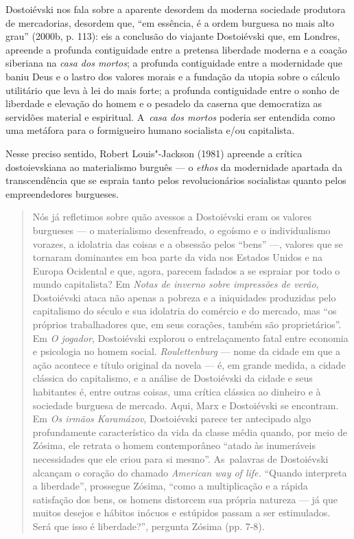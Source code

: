 Dostoiévski nos fala sobre a aparente desordem da moderna sociedade
produtora de mercadorias, desordem que, ``em essência, é a ordem
burguesa no mais alto grau'' (2000b, p. 113): eis a conclusão do
viajante Dostoiévski que, em Londres, apreende a profunda contiguidade
entre a pretensa liberdade moderna e a coação siberiana na \emph{casa
dos mortos}; a profunda contiguidade entre a modernidade que baniu Deus
e o lastro dos valores morais e a fundação da utopia sobre o cálculo
utilitário que leva à lei do mais forte; a profunda contiguidade entre o
sonho de liberdade e elevação do homem e o pesadelo da caserna que
democratiza as servidões material e espiritual. A~\emph{casa dos mortos}
poderia ser entendida como uma metáfora para o formigueiro humano
socialista e/ou capitalista.

Nesse preciso sentido, Robert Louis"-Jackson (1981) apreende a crítica
dostoievskiana ao materialismo burguês --- o \emph{ethos} da modernidade
apartada da transcendência que se espraia tanto pelos revolucionários
socialistas quanto pelos empreendedores burgueses.

\begin{quote}
Nós já refletimos sobre quão avessos a Dostoiévski eram os valores
burgueses --- o materialismo desenfreado, o egoísmo e o individualismo
vorazes, a idolatria das coisas e a obsessão pelos ``bens'' ---, valores
que se tornaram dominantes em boa parte da vida nos Estados Unidos e na
Europa Ocidental e que, agora, parecem fadados a se espraiar por todo o
mundo capitalista? Em \emph{Notas de inverno sobre impressões de verão},
Dostoiévski ataca não apenas a pobreza e a iniquidades produzidas pelo
capitalismo do século  e sua idolatria do comércio e do mercado, mas
``os próprios trabalhadores que, em seus corações, também são
proprietários''. Em \emph{O jogador}, Dostoiévski explorou o
entrelaçamento fatal entre economia e psicologia no homem social.
\emph{Roulettenburg} --- nome da cidade em que a ação acontece e título
original da novela --- é, em grande medida, a cidade clássica do
capitalismo, e a análise de Dostoiévski da cidade e seus habitantes é,
entre outras coisas, uma crítica clássica ao dinheiro e à sociedade
burguesa de mercado. Aqui, Marx e Dostoiévski se encontram. Em \emph{Os
irmãos Karamázov}, Dostoiévski parece ter antecipado algo profundamente
característico da vida da classe média quando, por meio de Zósima, ele
retrata o homem contemporâneo ``atado às inumeráveis necessidades que
ele criou para si mesmo''. As~palavras de Dostoiévski alcançam o coração
do chamado \emph{American way of life.} ``Quando interpreta a
liberdade'', prossegue Zósima, ``como a multiplicação e a rápida
satisfação dos bens, os homens distorcem sua própria natureza --- já que
muitos desejos e hábitos inócuos e estúpidos passam a ser estimulados.
Será que isso é liberdade?'', pergunta Zósima (pp. 7-8).
\end{quote}

